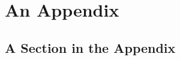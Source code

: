 \documentclass[numbered,pdftex]{ohio-etd}
\begin{document}
%
%
%
%
%
%
%
%




\appendix           %

\chapter{An Appendix}
\section{A Section in the Appendix}
\end{document}

